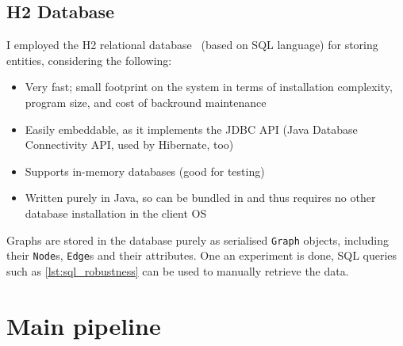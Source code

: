 \subsection{H2 Database}

I employed the H2 relational database~\cite{MuellerH2DatabaseEngine2006} (based on SQL language) for storing entities, considering the following:
\begin{itemize}[topsep=5pt,itemsep=-2pt]
    \item Very fast; small footprint on the system in terms of installation complexity, program size, and cost of backround maintenance
    \item Easily embeddable, as it implements the JDBC API (Java Database Connectivity API, used by Hibernate, too)
    \item Supports in-memory databases (good for testing)
    \item Written purely in Java, so can be bundled in \graffs and thus requires no other database installation in the client OS
\end{itemize}
Graphs are stored in the database purely as serialised \texttt{Graph} objects, including their \texttt{Node}s, \texttt{Edge}s and their attributes.
One an experiment is done, SQL queries such as \autoref{lst:sql_robustness} can be used to manually retrieve the data.




\section{Main pipeline}\label{sec:main_pipeline}

